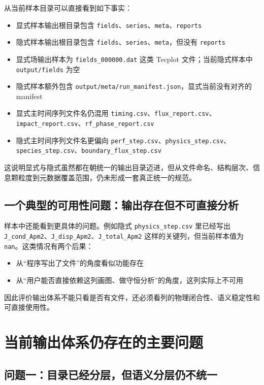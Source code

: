 \documentclass[11pt,a4paper]{ctexart}
\newcommand{\code}[1]{\texttt{#1}}
\newcommand{\file}[1]{\texttt{#1}}
\newcommand{\dir}[1]{\texttt{#1}}
\begin{document}
从当前样本目录可以直接看到如下事实：

\begin{itemize}
  \item 显式样本输出根目录包含 \dir{fields}、\dir{series}、\dir{meta}、\dir{reports}
  \item 隐式样本输出根目录包含 \dir{fields}、\dir{series}、\dir{meta}，但没有 \dir{reports}
  \item 显式场输出样本为 \file{fields\_000000.dat} 这类 Tecplot 文件；当前隐式样本中 \dir{output/fields} 为空
  \item 隐式样本额外包含 \file{output/meta/run\_manifest.json}，显式当前没有对齐的 manifest
  \item 显式主时间序列文件名仍混用 \file{timing.csv}、\file{flux\_report.csv}、\file{impact\_report.csv}、\file{rf\_phase\_report.csv}
  \item 隐式主时间序列文件名更偏向 \file{perf\_step.csv}、\file{physics\_step.csv}、\file{species\_step.csv}、\file{boundary\_flux\_step.csv}
\end{itemize}

这说明显式与隐式虽然都在朝统一的输出目录迈进，但从文件命名、结构层次、信息颗粒度到元数据覆盖范围，仍未形成一套真正统一的规范。

\subsection{一个典型的可用性问题：输出存在但不可直接分析}

样本中还能看到更具体的问题。例如隐式 \file{physics\_step.csv} 里已经写出 \code{J\_cond\_Apm2}、\code{J\_disp\_Apm2}、\code{J\_total\_Apm2} 这样的关键列，但当前样本值为 \code{nan}。这类情况有两个后果：

\begin{itemize}
  \item 从“程序写出了文件”的角度看似功能存在
  \item 从“用户能否直接依赖这列画图、做守恒分析”的角度，这列实际上不可用
\end{itemize}

因此评价输出体系不能只看是否有文件，还必须看列的物理闭合性、语义稳定性和可直接使用性。

\section{当前输出体系仍存在的主要问题}

\subsection{问题一：目录已经分层，但语义分层仍不统一}
\end{document}
